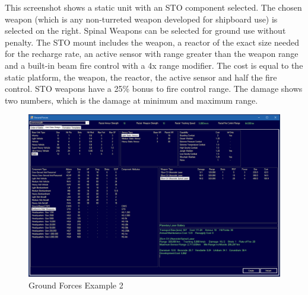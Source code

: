 \documentclass[../../../Aurora C# unofficial manual.tex]{subfiles}
\begin{document}
	This screenshot shows a static unit with an STO component selected. The chosen weapon (which is any non-turreted weapon developed for shipboard use) is selected on the right. Spinal Weapons can be selected for ground use without penalty. The STO mount includes the weapon, a reactor of the exact size needed for the recharge rate, an active sensor with range greater than the weapon range and a built-in beam fire control with a 4x range modifier. The cost is equal to the static platform, the weapon, the reactor, the active sensor and half the fire control. STO weapons have a 25\% bonus to fire control range. The damage shows two numbers, which is the damage at minimum and maximum range.
	\begin{figure}[H]
		\centering
		\includegraphics[width=0.9\linewidth]{images/GroundForces2}
		\caption[Ground Forces 2]{Ground Forces Example 2}
		\label{fig:groundforces2}
	\end{figure}
\end{document}
